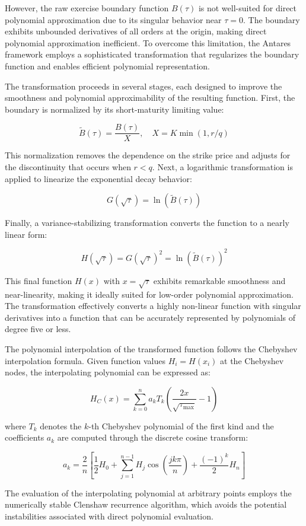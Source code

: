 \documentclass[
  american,
  11pt,
  11pt,
  letterpaper,
  onecolumn]{article}
\begin{document}
However, the raw exercise boundary function \(B(\tau)\) is not
well-suited for direct polynomial approximation due to its singular
behavior near \(\tau = 0\). The boundary exhibits unbounded derivatives
of all orders at the origin, making direct polynomial approximation
inefficient. To overcome this limitation, the Antares framework employs
a sophisticated transformation that regularizes the boundary function
and enables efficient polynomial representation.

The transformation proceeds in several stages, each designed to improve
the smoothness and polynomial approximability of the resulting function.
First, the boundary is normalized by its short-maturity limiting value:

\[\widetilde{B}(\tau) = \frac{B(\tau)}{X}, \quad X = K \min(1, r/q)\]

This normalization removes the dependence on the strike price and
adjusts for the discontinuity that occurs when \(r < q\). Next, a
logarithmic transformation is applied to linearize the exponential decay
behavior:

\[G(\sqrt{\tau}) = \ln(\widetilde{B}(\tau))\]

Finally, a variance-stabilizing transformation converts the function to
a nearly linear form:

\[H(\sqrt{\tau}) = G(\sqrt{\tau})^2 = \ln(\widetilde{B}(\tau))^2\]

This final function \(H(x)\) with \(x = \sqrt{\tau}\) exhibits
remarkable smoothness and near-linearity, making it ideally suited for
low-order polynomial approximation. The transformation effectively
converts a highly non-linear function with singular derivatives into a
function that can be accurately represented by polynomials of degree
five or less.

The polynomial interpolation of the transformed function follows the
Chebyshev interpolation formula. Given function values \(H_i = H(x_i)\)
at the Chebyshev nodes, the interpolating polynomial can be expressed
as:

\[H_C(x) = \sum_{k=0}^{n} a_k T_k\left(\frac{2x}{\sqrt{\tau_{\max}}} - 1\right)\]

where \(T_k\) denotes the \(k\)-th Chebyshev polynomial of the first
kind and the coefficients \(a_k\) are computed through the discrete
cosine transform:

\[a_k = \frac{2}{n}\left[\frac{1}{2}H_0 + \sum_{j=1}^{n-1} H_j \cos\left(\frac{jk\pi}{n}\right) + \frac{(-1)^k}{2}H_n\right]\]

The evaluation of the interpolating polynomial at arbitrary points
employs the numerically stable Clenshaw recurrence algorithm, which
avoids the potential instabilities associated with direct polynomial
evaluation.
\end{document}
